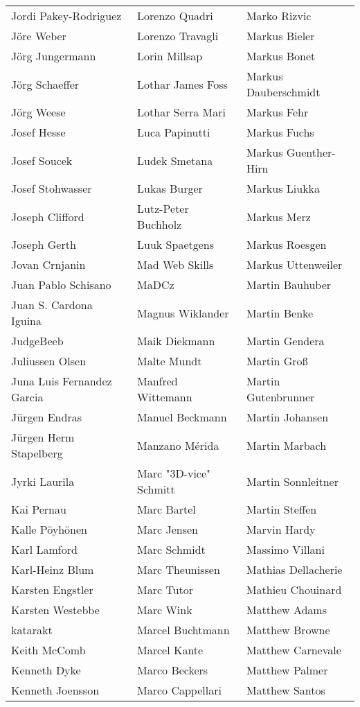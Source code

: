 \begin{small}
\begin{tabular}{p{4cm}p{4cm}p{4cm}}
Jordi Pakey-Rodriguez & Lorenzo Quadri & Marko Rizvic \\
Jöre Weber & Lorenzo Travagli & Markus Bieler \\
Jörg Jungermann & Lorin Millsap & Markus Bonet \\
Jörg Schaeffer & Lothar James Foss & Markus Dauberschmidt \\
Jörg Weese & Lothar Serra Mari & Markus Fehr \\
Josef Hesse & Luca Papinutti & Markus Fuchs \\
Josef Soucek & Ludek Smetana & Markus Guenther-Hirn \\
Josef Stohwasser & Lukas Burger & Markus Liukka \\
Joseph Clifford & Lutz-Peter Buchholz & Markus Merz \\
Joseph Gerth & Luuk Spaetgens & Markus Roesgen \\
Jovan Crnjanin & Mad Web Skills & Markus Uttenweiler \\
Juan Pablo Schisano & MaDCz & Martin Bauhuber \\
Juan S. Cardona Iguina & Magnus Wiklander & Martin Benke \\
JudgeBeeb & Maik Diekmann & Martin Gendera \\
Juliussen Olsen & Malte Mundt & Martin Groß \\
Juna Luis Fernandez Garcia & Manfred Wittemann & Martin Gutenbrunner \\
Jürgen Endras & Manuel Beckmann & Martin Johansen \\
Jürgen Herm Stapelberg & Manzano Mérida & Martin Marbach \\
Jyrki Laurila & Marc "3D-vice" Schmitt & Martin Sonnleitner \\
Kai Pernau & Marc Bartel & Martin Steffen \\
Kalle Pöyhönen & Marc Jensen & Marvin Hardy \\
Karl Lamford & Marc Schmidt & Massimo Villani \\
Karl-Heinz Blum & Marc Theunissen & Mathias Dellacherie \\
Karsten Engstler & Marc Tutor & Mathieu Chouinard \\
Karsten Westebbe & Marc Wink & Matthew Adams \\
katarakt & Marcel Buchtmann & Matthew Browne \\
Keith McComb & Marcel Kante & Matthew Carnevale \\
Kenneth Dyke & Marco Beckers & Matthew Palmer \\
Kenneth Joensson & Marco Cappellari & Matthew Santos \\

\end{tabular}
\end{small}
